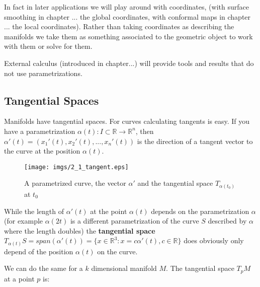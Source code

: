 In fact in later applications  we will play around with coordinates, (with surface smoothing in chapter ... the global coordinates, with conformal maps in chapter ... the local coordinates). Rather than taking coordinates as describing the manifolds we take them as something associated to the geometric object to work with them or solve for them.

External calculus (introduced in chapter...) will provide tools and results that do not use parametrizations.


	
\subsection{Tangential Spaces}		
Manifolds have tangential spaces.
For curves calculating tangents is easy. If you have a parametrization $\alpha(t): I \subset \mathbb R \to \mathbb R^n$, then $\alpha'(t) = (x_1'(t),x_2'(t),...,x_n'(t))$ is the direction of a tangent vector to the curve at the position $\alpha(t)$. 

\begin{figure}[tb]
\begin{center}
\texttt{[image: imgs/2\_1\_tangent.eps]}
\end{center}
\caption{A parametrized curve, the vector $\alpha'$ and the tangential space $T_{\alpha(t_0)}$ at $t_0$}
\end{figure}

		While the length of $\alpha'(t)$ at the point $\alpha(t)$ depends on the parametrization $\alpha$ (for example $\alpha(2t)$ is a different parametrization of the curve $S$ described by $\alpha$ where the length doubles) the \textbf{tangential space} $ T_{\alpha(t)}S = span(\alpha'(t)) = \{x \in \mathbb R^3: x = c \alpha'(t), c \in \mathbb R\}$ does obviously only depend of the position $\alpha(t)$ on the curve. 
		
We can do the same for a $k$ dimensional manifold $M$. The tangential space $T_p M$ at a point $p$ is:

